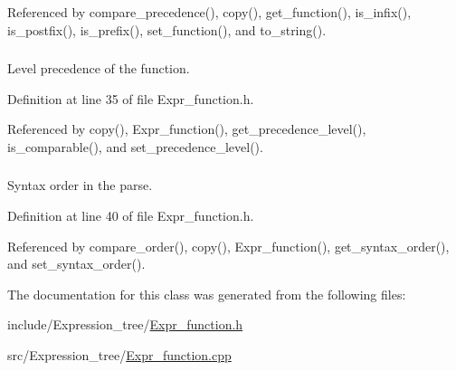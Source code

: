 Referenced by compare\_\-precedence(), copy(), get\_\-function(), is\_\-infix(), is\_\-postfix(), is\_\-prefix(), set\_\-function(), and to\_\-string().

\hypertarget{classgenevalmag_1_1Expr__function_a98a74d7ae5aaeb4b0d69c79845f8ce8f}{
\subsubsection[{precedence\_\-level}]{}}
\label{classgenevalmag_1_1Expr__function_a98a74d7ae5aaeb4b0d69c79845f8ce8f}


Level precedence of the function. 



Definition at line 35 of file Expr\_\-function.h.



Referenced by copy(), Expr\_\-function(), get\_\-precedence\_\-level(), is\_\-comparable(), and set\_\-precedence\_\-level().

\hypertarget{classgenevalmag_1_1Expr__function_adfde16cebcb1963e540a8f92eddb69a1}{
\subsubsection[{syntax\_\-order}]{}}
\label{classgenevalmag_1_1Expr__function_adfde16cebcb1963e540a8f92eddb69a1}


Syntax order in the parse. 



Definition at line 40 of file Expr\_\-function.h.



Referenced by compare\_\-order(), copy(), Expr\_\-function(), get\_\-syntax\_\-order(), and set\_\-syntax\_\-order().



The documentation for this class was generated from the following files:\begin{DoxyCompactItemize}
\item 
include/Expression\_\-tree/\hyperlink{Expr__function_8h}{Expr\_\-function.h}\item 
src/Expression\_\-tree/\hyperlink{Expr__function_8cpp}{Expr\_\-function.cpp}\end{DoxyCompactItemize}
